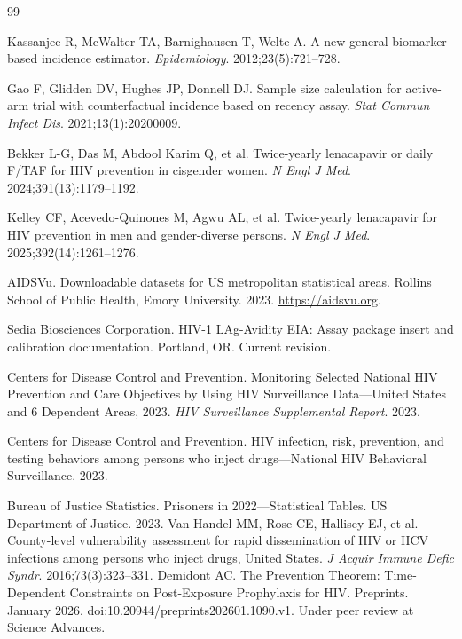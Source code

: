 \documentclass[12pt]{article}
\begin{document}

\begin{thebibliography}{99}

 Kassanjee R, McWalter TA, Barnighausen T, Welte A. A new general biomarker-based incidence estimator. \textit{Epidemiology}. 2012;23(5):721--728.

 Gao F, Glidden DV, Hughes JP, Donnell DJ. Sample size calculation for active-arm trial with counterfactual incidence based on recency assay. \textit{Stat Commun Infect Dis}. 2021;13(1):20200009.

 Bekker L-G, Das M, Abdool Karim Q, et al. Twice-yearly lenacapavir or daily F/TAF for HIV prevention in cisgender women. \textit{N Engl J Med}. 2024;391(13):1179--1192.

 Kelley CF, Acevedo-Quinones M, Agwu AL, et al. Twice-yearly lenacapavir for HIV prevention in men and gender-diverse persons. \textit{N Engl J Med}. 2025;392(14):1261--1276.

 AIDSVu. Downloadable datasets for US metropolitan statistical areas. Rollins School of Public Health, Emory University. 2023. \url{https://aidsvu.org}.

 Sedia Biosciences Corporation. HIV-1 LAg-Avidity EIA: Assay package insert and calibration documentation. Portland, OR. Current revision.

 Centers for Disease Control and Prevention. Monitoring Selected National HIV Prevention and Care Objectives by Using HIV Surveillance Data---United States and 6 Dependent Areas, 2023. \textit{HIV Surveillance Supplemental Report}. 2023.

 Centers for Disease Control and Prevention. HIV infection, risk, prevention, and testing behaviors among persons who inject drugs---National HIV Behavioral Surveillance. 2023.

 Bureau of Justice Statistics. Prisoners in 2022---Statistical Tables. US Department of Justice. 2023.
 Van Handel MM, Rose CE, Hallisey EJ, et al. County-level vulnerability assessment for rapid dissemination of HIV or HCV infections among persons who inject drugs, United States. \emph{J Acquir Immune Defic Syndr}. 2016;73(3):323--331.
 Demidont AC. The Prevention Theorem: Time-Dependent Constraints on Post-Exposure Prophylaxis for HIV. Preprints. January 2026. doi:10.20944/preprints202601.1090.v1. Under peer review at Science Advances.


\end{thebibliography}
\end{document}
